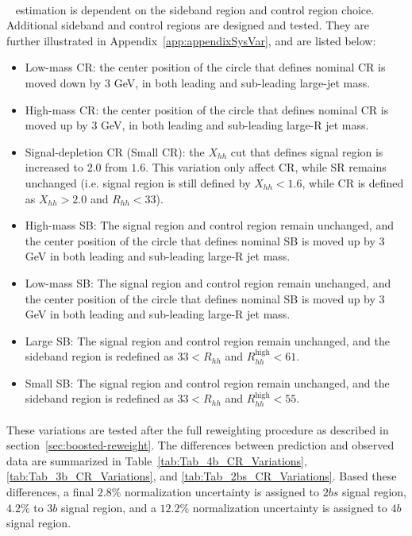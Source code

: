 \paragraph{}
\muqcd~ estimation is dependent on the sideband region and control region choice.
Additional sideband and control regions are designed and tested. 
They are further illustrated in Appendix~\ref{app:appendixSysVar}, and are listed below:
\begin{itemize}
	\item Low-mass CR: the center position of the circle that defines nominal CR is moved down by 3 GeV, in both leading and sub-leading large-jet mass.
	\item High-mass CR: the center position of the circle that defines nominal CR is moved up by 3 GeV, in both leading and sub-leading large-R jet mass.
	\item Signal-depletion CR (Small CR): the $X_{hh}$ cut that defines signal region is increased to $2.0$ from $1.6$. This variation only affect CR, while SR remains unchanged (i.e. signal region is still defined by $X_{hh}<1.6$, while CR is defined as $X_{hh}>2.0$ and $R_{hh}<33$).
	\item High-mass SB: The signal region and control region remain unchanged, and the center position of the circle that defines nominal SB is moved up by 3 GeV in both leading and sub-leading large-R jet mass.
	\item Low-mass SB: The signal region and control region remain unchanged, and the center position of the circle that defines nominal SB is moved up by 3 GeV in both leading and sub-leading large-R jet mass.
	\item Large SB: The signal region and control region remain unchanged, and the sideband region is redefined as $33 < R_{hh}$ and $ R_{hh}^{\text{high}} < 61$. 
	\item Small SB: The signal region and control region remain unchanged, and the sideband region is redefined as $33 < R_{hh}$ and $ R_{hh}^{\text{high}} < 55$.
\end{itemize}

\paragraph{} 
These variations are tested after the full reweighting procedure as described in section~\ref{sec:boosted-reweight}.
The differences between prediction and observed data are summarized in Table~\ref{tab:Tab_4b_CR_Variations}, \ref{tab:Tab_3b_CR_Variations}, and \ref{tab:Tab_2bs_CR_Variations}.
Based these differences, a final $2.8\%$ normalization uncertainty is assigned to $2bs$ signal region, $4.2\%$ to $3b$ signal region, and a $12.2\%$ normalization uncertainty is assigned to $4b$ signal region.

